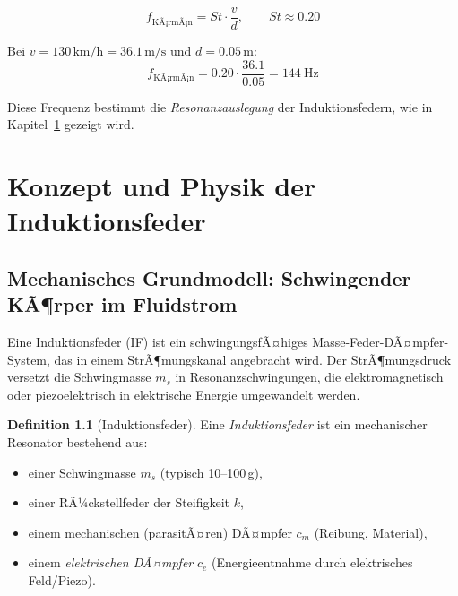 ﻿\documentclass[12pt, a4paper]{report}
\theoremstyle{definition}
\newtheorem{definition}[theorem]{Definition}
\theoremstyle{remark}
\begin{document}
\begin{equation}
  f_{\text{KÃ¡rmÃ¡n}} = St \cdot \frac{v}{d}, \qquad St \approx 0.20
  \label{eq:strouhal}
\end{equation}

Bei $v = 130\,\text{km/h} = 36.1\,\text{m/s}$ und $d = 0.05\,\text{m}$:
\begin{equation}
  f_{\text{KÃ¡rmÃ¡n}} = 0.20 \cdot \frac{36.1}{0.05} = \SI{144}{\hertz}
  \label{eq:f_karman_130}
\end{equation}

Diese Frequenz bestimmt die \emph{Resonanzauslegung} der Induktionsfedern,
wie in Kapitel~\ref{chap:federsystem} gezeigt wird.

\chapter{Konzept und Physik der Induktionsfeder}
\label{chap:federsystem}

\section{Mechanisches Grundmodell: Schwingender KÃ¶rper im Fluidstrom}

Eine Induktionsfeder (IF) ist ein schwingungsfÃ¤higes Masse-Feder-DÃ¤mpfer-System,
das in einem StrÃ¶mungskanal angebracht wird. Der StrÃ¶mungsdruck versetzt die
Schwingmasse $m_s$ in Resonanzschwingungen, die elektromagnetisch oder
piezoelektrisch in elektrische Energie umgewandelt werden.

\begin{definition}[Induktionsfeder]
  Eine \emph{Induktionsfeder} ist ein mechanischer Resonator bestehend aus:
  \begin{itemize}
    \item einer Schwingmasse $m_s$ (typisch 10--100\,g),
    \item einer RÃ¼ckstellfeder der Steifigkeit $k$,
    \item einem mechanischen (parasitÃ¤ren) DÃ¤mpfer $c_m$ (Reibung, Material),
    \item einem \emph{elektrischen DÃ¤mpfer} $c_e$ (Energieentnahme durch
          elektrisches Feld/Piezo).
  \end{itemize}
\end{definition}
\end{document}
